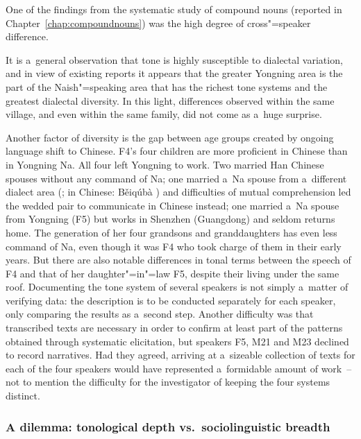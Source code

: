 One of the findings from the systematic study of {compound} nouns (reported in Chapter~\ref{chap:compoundnouns}) was the high
degree of cross"=speaker difference.

It is a~general observation that tone is highly susceptible to dialectal variation, and in view of
existing reports it appears that the greater Yongning area is the part of the {Naish}"=speaking
area that has the richest tone systems and the greatest dialectal diversity. In this light,
differences observed within the same village, and even within the same family, did not come as
a~huge surprise.

Another factor of diversity is the gap between age groups created by ongoing language shift to
Chinese. F4’s four children are more proficient in Chinese than in Yongning Na. All four left Yongning to
work. Two married Han Chinese spouses without any command of Na; one married a~Na spouse from
a~different dialect area (; in Chinese: Běiqúbà ) and difficulties of mutual comprehension led the wedded pair to communicate
in Chinese instead; one married a~Na spouse from Yongning (F5) but works in Shenzhen (Guangdong) and seldom returns
home. The generation of her four grandsons and granddaughters has even less command of Na, even
though it was F4 who took charge of them in their early years. But there are also notable
differences in tonal terms between the speech of F4 and that of her
daughter"=in"=law F5, despite their living under the same roof. Documenting the tone system of several
speakers is not simply a~matter of verifying data: the description is to be conducted
separately for each speaker, only comparing the results as a~second step. Another difficulty was
that transcribed texts are necessary in order to confirm at least part of the patterns obtained
through systematic elicitation, but speakers F5, M21 and M23 declined to record narratives. Had they agreed, arriving at a~sizeable collection of texts for each of the four speakers would have represented
a~formidable amount of work~-- not to mention the difficulty for the investigator of
keeping the four systems distinct.


\subsubsection{A dilemma: tonological depth vs.\ sociolinguistic breadth}
\label{sec:adilemmabreadthofcoverageofthetonesystemvsbreadthofsociolinguisticcoverage}

